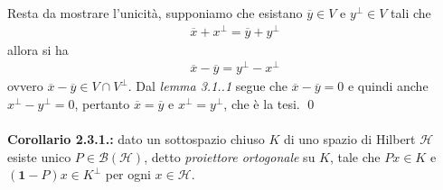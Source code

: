 \documentclass{article}
\numberwithin{equation}{subsection}
\begin{document}
Resta da mostrare l'unicità, supponiamo che esistano $\overline{y} \in V$ e $y^\perp \in V$ tali che 
\begin{align*}
    \overline{x} + x^\perp = \overline{y} + y^\perp 
\end{align*}
allora si ha 
\begin{align*}
    \overline{x} - \overline{y} = y^\perp - x^\perp 
\end{align*}
ovvero $\overline{x} - \overline{y} \in V \cap V^\perp$. Dal \textit{lemma 3.1..1} segue che $\overline{x} - \overline{y} = 0$ e quindi anche $x^\perp - y^\perp = 0$, pertanto $\overline{x} = \overline{y}$ e $x^\perp = y^\perp$, che è la tesi. \qed \\ \\
\textbf{Corollario 2.3.1.:} dato un sottospazio chiuso $K$ di uno spazio di Hilbert $\mathcal{H}$ esiste unico $P \in \mathcal{B}(\mathcal{H})$, detto \textit{proiettore ortogonale} su $K$, tale che $Px \in K$ e $(\mathbf{1} - P)x \in K^\perp$ per ogni $x \in \mathcal{H}$. \\
\end{document}
